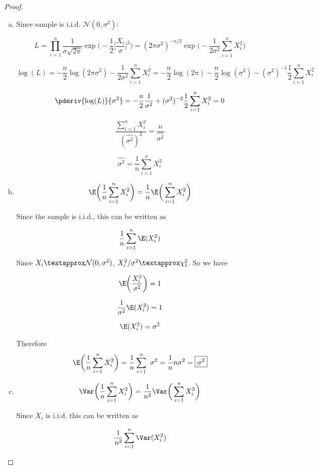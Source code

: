 \begin{proof}

\begin{enumerate}[a.]

\item Since sample is i.i.d. \(\mathcal{N}(0, \sigma^2) \):

\[
L = \prod_{i=1}^n \frac{1}{\sigma \sqrt{2 \pi}} \exp\bigg(- \frac{1}{2} \bigg[\frac{X_i}{\sigma}\bigg]^2 \bigg) = (2 \pi\sigma^2)^{-n/2} \exp\bigg(- \frac{1}{2 \sigma^2} \sum_{i=1}^n X_i^2 \bigg)
\]

\[
\log(L) = -\frac{n}{2} \log(2 \pi\sigma^2) - \frac{1}{2 \sigma^2} \sum_{i=1}^n X_i^2 =  -\frac{n}{2} \log(2 \pi) - \frac{n}{2} \log(\sigma^2) - (\sigma^2)^{-1} \frac{1}{2} \sum_{i=1}^n X_i^2
\]

\[
\pderiv{\log(L)}{\sigma^2} = -\frac{n}{2} \frac{1}{\sigma^2} +   ({\sigma^2})^{-2} \frac{1}{2}  \sum_{i=1}^n X_i^2 = 0
\]

\[
\frac{\sum_{i=1}^n X_i^2}{(\hat{\sigma^2})^2}  = \frac{n}{\hat{\sigma^2}}
\]

\[
\hat{\sigma^2} = \frac{1}{n} \sum_{i=1}^n X_i^2
\]


\item 

\[
\E \bigg(  \frac{1}{n} \sum_{i=1}^n X_i^2 \bigg) = \frac{1}{n} \E \bigg(  \sum_{i=1}^n X_i^2 \bigg)
\]

Since the sample is i.i.d., this can be written as 

\[
 \frac{1}{n}   \sum_{i=1}^n \E (X_i^2)
\]

Since \(X_i \textapprox \mathcal{N}(0, \sigma^2) \), \(X_i^2/\sigma^2 \textapprox \chi_1^2\). So we have

\[
\E\bigg( \frac{X_i^2}{\sigma^2} \bigg) = 1
\]

\[
\frac{1}{\sigma^2} \E( X_i^2) = 1
\]

\[
\E( X_i^2) = \sigma^2
\]

Therefore
\[
\E \bigg(  \frac{1}{n} \sum_{i=1}^n X_i^2 \bigg) = \frac{1}{n}   \sum_{i=1}^n \ \sigma^2 = \frac{1}{n} n \sigma^2 = \boxed{\sigma^2}
\]



\item

\[
\Var \bigg( \frac{1}{n} \sum_{i=1}^n X_i^2 \bigg) = \frac{1}{n^2} \Var \bigg( \sum_{i=1}^n X_i^2 \bigg)
\]

Since \(X_i\) is i.i.d. this can be written as 

\[
\frac{1}{n^2} \sum_{i=1}^n \Var (X_i^2 )
\]


\end{enumerate}
\end{proof}
